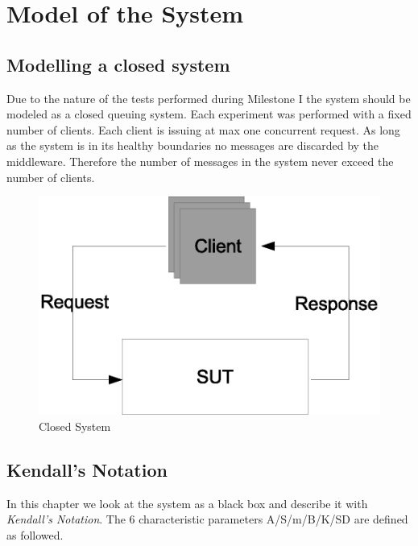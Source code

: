\documentclass[a4paper]{article}
\begin{document}
\section{Model of the System}
\label{sec:SystemModel}

\subsection{Modelling a closed system}
Due to the nature of the tests performed during Milestone I the system should be modeled as a closed queuing system. Each experiment was performed with a fixed number of clients. Each client is issuing at max one concurrent request. As long as the system is in its healthy boundaries no messages are discarded by the middleware. Therefore the number of messages in the system never exceed the number of clients.



\begin{figure}[H]
	\begin{center}
    \includegraphics[scale=0.4]{../drawings-ms2/sut.eps}
  \end{center}
  \caption{Closed System}
  \label{fig:closedsystem}
\end{figure}




\subsection{Kendall's Notation}
In this chapter we look at the system as a black box and describe it with \textit{Kendall's Notation}. The 6 characteristic parameters A/S/m/B/K/SD are defined as followed.
\end{document}
